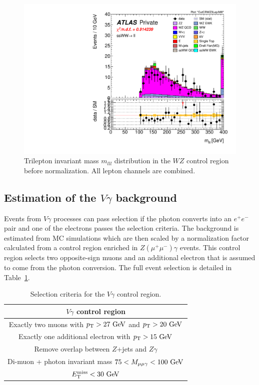 \begin{figure}[htbp]
  \centering
  \includegraphics[width=.48\textwidth]{figs/ssww_13tev/backgrounds/wz/ll-CutCRWZ3Lep-Mlll-lin}
  \caption{Trilepton invariant mass $m_{lll}$ distribution in the $WZ$ control region before normalization.  All lepton channels are combined.}
  \label{fig:ssww13tev_wzcr_lep0}
\end{figure}

\subsection{Estimation of the $V\gamma$ background}\label{ssww13tev:wgamma}
Events from $V\gamma$ processes can pass selection if the photon converts into an $e^{+}e^{-}$ pair and one of the electrons passes the selection criteria.
The background is estimated from MC simulations which are then scaled by a normalization factor calculated from a control region enriched in $Z(\mu^{+}\mu^{-})\gamma$ events.
This control region selects two opposite-sign muons and an additional electron that is assumed to come from the photon conversion.
The full event selection is detailed in Table~\ref{tab:ssww13tev_vgamma_cr}.

\begin{table}[htbp]
  \centering
  \begin{tabular}{c}
    $V\gamma$ control region \\
    \hline\hline
    Exactly two muons with $\pt > 27\gev$ and $\pt > 20\gev$ \\
    Exactly one additional electron with $\pt > 15\gev$ \\
    Remove overlap between $Z$+jets and $Z\gamma$ \\
    Di-muon + photon invariant mass $75 < M_{\mu\mu\gamma} < 100\gev$ \\
    $\met < 30\gev$ \\
    \hline
  \end{tabular}
  \caption{Selection criteria for the $V\gamma$ control region.}
  \label{tab:ssww13tev_vgamma_cr}
\end{table}

